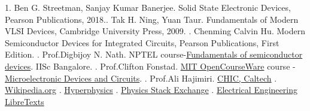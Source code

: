 \documentclass[12 pt]{article}
\begin{document}
1. Ben G. Streetman, Sanjay Kumar Banerjee. Solid State Electronic Devices, Pearson Publications, 2018.\newline {}. Tak H. Ning, Yuan Taur. Fundamentals of Modern VLSI Devices, Cambridge   University Press, 2009. \newline {}. Chenming Calvin Hu. Modern Semiconductor Devices for Integrated Circuits,
Pearson Publications, First Edition. \newline {}. Prof.Digbijoy N. Nath. NPTEL course-\href{https://www.youtube.com/playlist?list=PLgMDNELGJ1CaNcuuQv9xN07ZWkXE-wCGP}{Fundamentals of semiconductor devices}. IISc Bangalore. \newline {}. Prof.Clifton Fonstad. \href{https://ocw.mit.edu/}{MIT OpenCourseWare} course - \href{https://ocw.mit.edu/courses/6-012-microelectronic-devices-and-circuits-fall-2009/}{Microelectronic Devices and Circuits}. \newline {}. Prof.Ali Hajimiri. \href{https://chic.caltech.edu/links/}{CHIC, Caltech} \newline {}. \href{https://en.wikipedia.org/wiki/Main_Page}{Wikipedia.org} \newline {}. \href{http://hyperphysics.phy-astr.gsu.edu/hbase/index.html}{Hyperphysics} \newline {}. \href{https://physics.stackexchange.com/}{Physics Stack Exchange} \newline {}. \href{https://eng.libretexts.org/Bookshelves/Electrical_Engineering}{Electrical Engineering LibreTexts} \newline \newline
\end{document}
